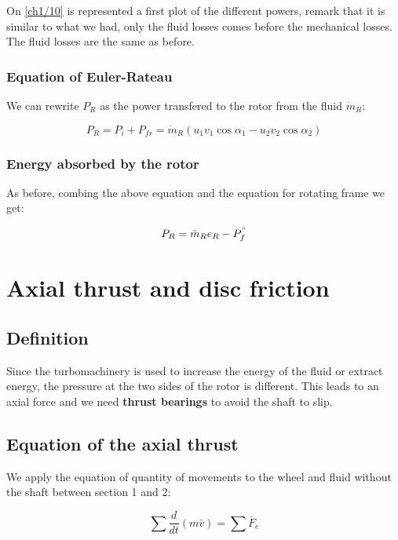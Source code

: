 On \autoref{ch1/10} is represented a first plot of the different powers, remark that it is similar to what we had, only the fluid losses comes before the mechanical losses. The fluid losses are the same as before. 


\subsubsection{Equation of Euler-Rateau}
We can rewrite $P_R$ as the power transfered to the rotor from the fluid $\dot{m}_R$: 

\begin{equation}
P_R = P_i + P_{fr} = \dot{m} _R (u_1v_1\cos \alpha _1 - u_2v_2\cos \alpha _2) 
\end{equation}

\subsubsection{Energy absorbed by the rotor}
As before, combing the above equation and the equation for rotating frame we get: 

\begin{equation}
P_R = \dot{m}_R e_R - P^"_f
\end{equation}


\section{Axial thrust and disc friction}
\subsection{Definition}
Since the turbomachinery is used to increase the energy of the fluid or extract energy, the pressure at the two sides of the rotor is different. This leads to an axial force and we need \textbf{thrust bearings} to avoid the shaft to slip. 

\subsection{Equation of the axial thrust}
We apply the equation of quantity of movements to the wheel and fluid without the shaft between section 1 and 2: 

\begin{equation}
\sum \frac{d}{dt}(m\bar{v}) = \sum \bar{F}_e
\end{equation}

